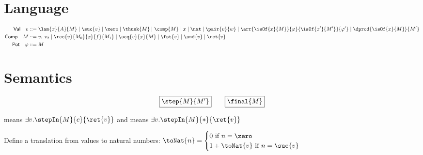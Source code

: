 \section{Language}

\begin{align*}
    \mathsf{Val} \quad v &::= \lam{x}{A}{M} 
    \mid \suc{v}
    \mid \zero 
    \mid \thunk{M}
    \mid \comp{M}
    \mid x
    \mid \nat
    \mid \pair{v}{w}
    \mid \arr{\isOf{x}{M}}{\varphi}{\isOf{x'}{M'}}{\varphi'}
    \mid \dprod{\isOf{x}{M}}{M'}\\
    \mathsf{Comp} \quad M &::= 
     v_1 \; v_2
    \mid \rec{v}{M_0}{x}{f}{M_1}
    \mid \seq{v}{x}{M}
    \mid \fst{v}
    \mid \snd{v}
    \mid \ret{v}\\
    \mathsf{Pot} \quad \varphi &::= M
\end{align*}

\section{Semantics}
\[
\fbox{$\step{M}{M'}$} \quad\quad \fbox{$\final{M}$}
\]

\begin{mathpar}








\end{mathpar}

 means $\exists v. \stepIn{M}{c}{\ret{v}}$ and  means $\exists v.
\stepIn{M}{*}{\ret{v}}$

Define a translation from values to natural numbers: 
$\toNat{n} = \begin{cases} 0 \text{ if } n = \zero\\
1+\toNat{v} \text{ if } n = \suc{v} \end{cases}$


